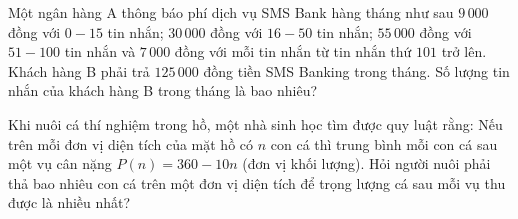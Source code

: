 \hienthiloigiaibt
\begin{bt}%
	Một ngân hàng A thông báo phí dịch vụ SMS Bank hàng tháng như sau $9\,000$ đồng với $0-15$ tin nhắn; $30\,000$ đồng với $16-50$ tin nhắn; $55\,000$ đồng với $51-100$ tin nhắn và $7\,000$ đồng với mỗi tin nhắn từ tin nhắn thứ $101$ trở lên. Khách hàng B phải trả $125\,000$ đồng tiền SMS Banking trong tháng. Số lượng tin nhắn của khách hàng B trong tháng là bao nhiêu?
\end{bt}
\begin{bt}%
	Khi nuôi cá thí nghiệm trong hồ, một nhà sinh học tìm được quy luật rằng: Nếu trên mỗi đơn vị diện tích của mặt hồ có $n$ con cá thì trung bình mỗi con cá sau một vụ cân nặng $P(n)=360-10n$ (đơn vị khối lượng). Hỏi người nuôi phải thả bao nhiêu con cá trên một đơn vị diện tích để trọng lượng cá sau mỗi vụ thu được là nhiều nhất?
\end{bt}
